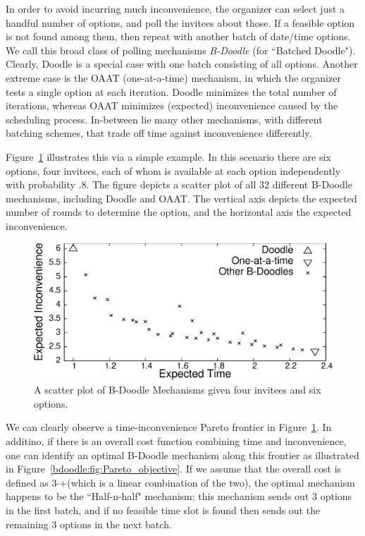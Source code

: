 In order to avoid incurring much inconvenience, 
the organizer can select just a handful number of options,
and poll the invitees about those. If a feasible option is not found
among them, then repeat with another batch of date/time options. 
We call this broad class of polling mechanisms \emph{B-Doodle} (for ``Batched Doodle").
Clearly, Doodle is a special case with one batch consisting of all
options. Another extreme case is the OAAT (one-at-a-time)
mechanism, in which the organizer tests a single option at each
iteration. Doodle minimizes the total number of iterations, whereas 
OAAT minimizes (expected) inconvenience caused by the scheduling process.
In-between lie many other mechanisms, with different
batching schemes, that trade off time against inconvenience
differently.

Figure~\ref{bdoodle:fig:Pareto_scatter} illustrates this via a simple example.
In this scenario there are six options, four invitees, each of whom
is available at each option independently with probability $.8$.
The figure depicts a scatter plot of all 32 different B-Doodle mechanisms,
including Doodle and OAAT. The vertical axis depicts the expected
number of rounds to determine the option, and the horizontal axis
the expected inconvenience.

\begin{figure}[h!] \small
\centering
\includegraphics[scale=0.48]{plots/pareto_scatter_fin.eps}
\caption{A scatter plot of B-Doodle Mechanisms given four invitees and six options.}
\label{bdoodle:fig:Pareto_scatter}
\end{figure}

We can clearly observe a time-inconvenience Pareto frontier in Figure~\ref{bdoodle:fig:Pareto_scatter}. 
In additino, if there is an overall cost function combining time
and inconvenience, one can identify an optimal B-Doodle mechanism
along this frontier as illustrated in
Figure~\ref{bdoodle:fig:Pareto_objective}. 
If we assume that the overall cost is defined as 3$\cdot$\Time+\Inconveniences (which is a linear combination of the two), the optimal mechanism happens to be the ``Half-n-half" mechanism; this mechanism
sends out $3$ options in the first batch, and if no feasible time
slot is found then sends out the remaining $3$ options in the next
batch.

